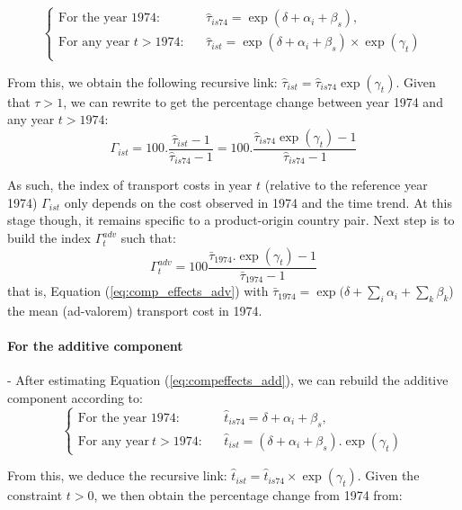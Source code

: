 \documentclass[a4paper,11pt]{article}
\begin{document}
\[\left\{
  \begin{array}{lcl}
  \text{For the year 1974:} &&  \widehat{\tau}_{is74} = \exp(\delta +\alpha_i+\beta_s), \\
  \text{For any year }t> 1974:&& \widehat{\tau}_{ist} = \exp(\delta +\alpha_i+\beta_s)\times \exp(\gamma_t) \\
  \end{array}
\right.\]

From this, we obtain the following recursive link: $\widehat{\tau}_{ist} = \widehat{\tau}_{is74}\exp(\gamma_t)$.
Given that $\tau >1$, we can rewrite to get the percentage change between year 1974 and any year $t>1974$:
\begin{equation*}
\Gamma_{ist} = 100.\frac{\widehat{\tau}_{ist}-1}{\widehat{\tau}_{is74}-1} = 100.\frac{\widehat{\tau}_{is74}\exp(\gamma_t)-1}{\widehat{\tau}_{is74}-1}
\end{equation*}

As such, the index of transport costs in year $t$ (relative to the reference year 1974) $\Gamma_{ist} $  only depends on the cost observed in 1974 and the time trend.
At this stage though, it remains specific to a product-origin country pair.
Next step is to build the index $\Gamma^{adv}_t$ such that:
\begin{equation}
 \Gamma^{adv}_t= 100\frac {\bar{\tau}_{1974}.\exp(\gamma_t)-1} {\bar{\tau}_{1974}-1}  \label{eq:tcadv_compoeffect}
\end{equation}
\noindent that is, Equation (\ref{eq:comp_effects_adv}) with $\bar{\tau}_{1974} = \exp(\delta + \sum_i \alpha_i + \sum_k \beta_k$) the mean (ad-valorem) transport cost in 1974.

\paragraph{For the additive component} - After estimating Equation (\ref{eq:compeffects_add}), we can rebuild the additive component according to:
\[\left\{
  \begin{array}{lcl}
\text{For the year 1974:}&&\widehat{t}_{is74}=  \delta + \alpha_i+ \beta_s, \\
\text{For any year}~t> 1974:&&\widehat{t}_{ist}=\left(\delta + \alpha_i+ \beta_s\right).\exp(\gamma_t)
\end{array}
\right.\]

From this, we deduce the recursive link: $\widehat{t}_{ist} = \widehat{t}_{is74} \times \exp(\gamma_t)$.
Given the constraint $t>0$, we then obtain the percentage change from 1974 from:
\end{document}
